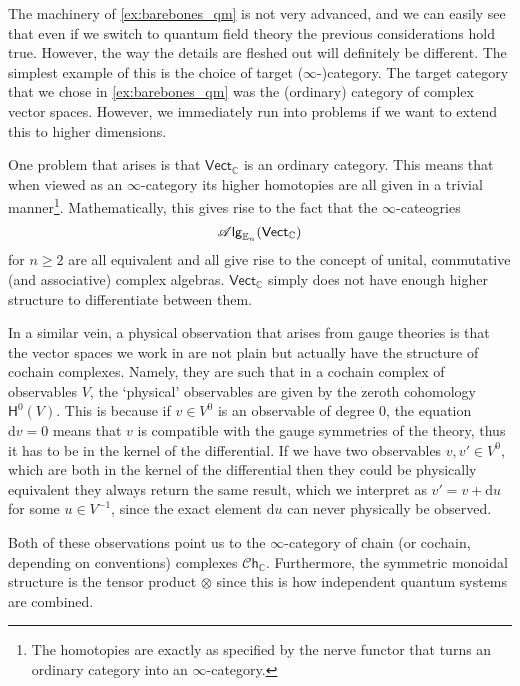 \documentclass[../text]{subfiles}
\begin{document}
\begin{example}
    The machinery of \cref{ex:barebones_qm} is not very advanced, and we can easily see that even if we switch to quantum field theory the previous considerations hold true. However, the way the details are fleshed out will definitely be different. The simplest example of this is the choice of target ($\infty$-)category. The target category that we chose in \cref{ex:barebones_qm} was the (ordinary) category of complex vector spaces. However, we immediately run into problems if we want to extend this to higher dimensions.

    One problem that arises is that $\mathsf{Vect}_{\mathbb{C}}$ is an ordinary category. This means that when viewed as an $\infty$-category its higher homotopies are all given in a trivial manner\footnote{The homotopies are exactly as specified by the nerve functor that turns an ordinary category into an $\infty$-category.}. Mathematically, this gives rise to the fact that the $\infty$-cateogries
    \begin{equation}
        \mathscr{A} \mathsf{lg}_{\mathbb{E}_n} (\mathsf{Vect}_{\mathbb{C}})
    \end{equation}
    for $n \geq 2$ are all equivalent and all give rise to the concept of unital, commutative (and associative) complex algebras. $\mathsf{Vect}_{\mathbb{C}}$ simply does not have enough higher structure to differentiate between them. 

    In a similar vein, a physical observation that arises from gauge theories is that the vector spaces we work in are not plain but actually have the structure of cochain complexes. Namely, they are such that in a cochain complex of observables $V$, the `physical' observables are given by the zeroth cohomology $\mathsf{H}^0(V)$. This is because if $v \in V^0$ is an observable of degree 0, the equation $\mathrm{d} v = 0$ means that $v$ is compatible with the gauge symmetries of the theory, thus it has to be in the kernel of the differential. If we have two observables $v, v' \in V^0$, which are both in the kernel of the differential then they could be physically equivalent they always return the same result, which we interpret as $v' = v + \mathrm{d}u$ for some $u \in V^{-1}$, since the exact element $\mathrm{d} u$ can never physically be observed.

    Both of these observations point us to the $\infty$-category of chain (or cochain, depending on conventions) complexes $\mathscr{C}\mathsf{h}_{\mathbb{C}}$. Furthermore, the symmetric monoidal structure is the tensor product $\otimes$ since this is how independent quantum systems are combined.


\end{example}
\end{document}
